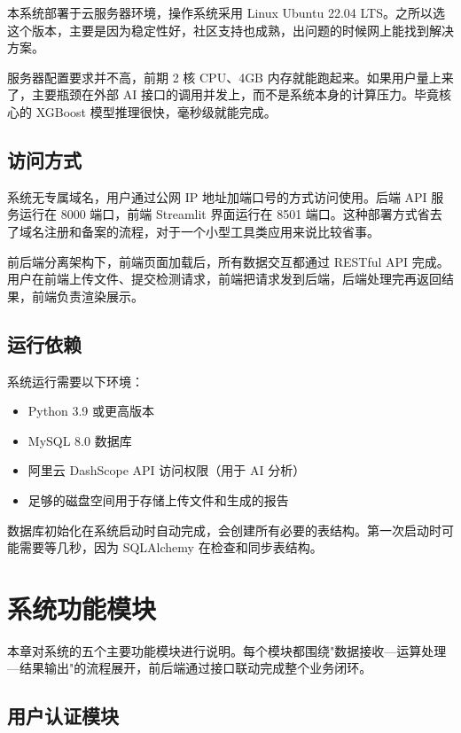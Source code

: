\documentclass[12pt,a4paper]{ctexart}
\begin{document}
本系统部署于云服务器环境，操作系统采用 Linux Ubuntu 22.04 LTS。之所以选这个版本，主要是因为稳定性好，社区支持也成熟，出问题的时候网上能找到解决方案。

服务器配置要求并不高，前期 2 核 CPU、4GB 内存就能跑起来。如果用户量上来了，主要瓶颈在外部 AI 接口的调用并发上，而不是系统本身的计算压力。毕竟核心的 XGBoost 模型推理很快，毫秒级就能完成。

\subsection{访问方式}

系统无专属域名，用户通过公网 IP 地址加端口号的方式访问使用。后端 API 服务运行在 8000 端口，前端 Streamlit 界面运行在 8501 端口。这种部署方式省去了域名注册和备案的流程，对于一个小型工具类应用来说比较省事。

前后端分离架构下，前端页面加载后，所有数据交互都通过 RESTful API 完成。用户在前端上传文件、提交检测请求，前端把请求发到后端，后端处理完再返回结果，前端负责渲染展示。

\subsection{运行依赖}

系统运行需要以下环境：

\begin{itemize}
    \item Python 3.9 或更高版本
    \item MySQL 8.0 数据库
    \item 阿里云 DashScope API 访问权限（用于 AI 分析）
    \item 足够的磁盘空间用于存储上传文件和生成的报告
\end{itemize}

数据库初始化在系统启动时自动完成，会创建所有必要的表结构。第一次启动时可能需要等几秒，因为 SQLAlchemy 在检查和同步表结构。

\newpage

\section{系统功能模块}

本章对系统的五个主要功能模块进行说明。每个模块都围绕"数据接收—运算处理—结果输出"的流程展开，前后端通过接口联动完成整个业务闭环。

\subsection{用户认证模块}
\end{document}
